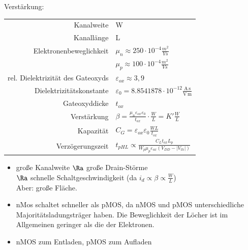 \documentclass[english]{latex4ei/latex4ei_sheet}
\begin{document}
Verstärkung:  \\
\begin{tabular} {r | l}
    Kanalweite                        & W                                                                                                \\
    Kanallänge                        & L                                                                                                \\
    Elektronenbeweglichkeit           & $\mu_n \approx 250 \cdot 10^{-4} \frac{m^2}{Vs}$                                                 \\
                                      & $\mu_p \approx 100 \cdot 10^{-4} \frac{m^2}{Vs}$                                                 \\
    rel. Dielektrizität des Gateoxyds & $\varepsilon_{ox} \approx 3,9$                                                                   \\
    Dielektrizitätskonstante          & $\varepsilon_0 = 8.8541878 \cdot 10^{-12} \frac{\mathrm{A\,s}}{\mathrm{V\,m}}$                   \\
    Gateoxyddicke                     & $t_{ox}$                                                                                         \\
    Verstärkung                       & $\beta = \frac{\mu_n \varepsilon_{ox} \varepsilon_0}{t_{ox}} \cdot \frac{W}{L} = K' \frac{W}{L}$ \\
    Kapazität                         & $C_G = \varepsilon_{ox} \varepsilon_0 \frac{WL}{t_{ox}}$                                         \\
    Verzögerungszeit                  & $t_{pHL} \propto \frac{C_L t_{ox} L_p}{W_p \mu_p \varepsilon_{ox} (V_{DD} - |V_{th}|)}$          \\
\end{tabular}
\begin{itemize}
    \item große Kanalweite $\Ra$ große Drain-Störme \\ $\Ra$ schnelle Schaltgeschwindigkeit (da $i_d \propto \beta \propto \frac{W}{L}$) \\
          Aber: große Fläche.
    \item nMos schaltet schneller als pMOS, da nMOS und pMOS unterschiedliche Majoritätsladungsträger haben. Die Beweglichkeit der Löcher ist im Allgemeinen geringer als die der Elektronen.
    \item nMOS zum Entladen, pMOS zum Aufladen
\end{itemize}
\end{document}
